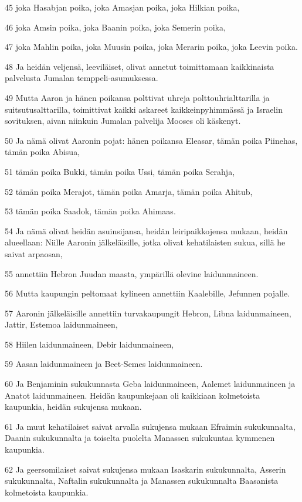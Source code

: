 \par 45 joka Hasabjan poika, joka Amasjan poika, joka Hilkian poika,
\par 46 joka Amsin poika, joka Baanin poika, joka Semerin poika,
\par 47 joka Mahlin poika, joka Muusin poika, joka Merarin poika, joka Leevin poika.
\par 48 Ja heidän veljensä, leeviläiset, olivat annetut toimittamaan kaikkinaista palvelusta Jumalan temppeli-asumuksessa.
\par 49 Mutta Aaron ja hänen poikansa polttivat uhreja polttouhrialttarilla ja suitsutusalttarilla, toimittivat kaikki askareet kaikkeinpyhimmässä ja Israelin sovituksen, aivan niinkuin Jumalan palvelija Mooses oli käskenyt.
\par 50 Ja nämä olivat Aaronin pojat: hänen poikansa Eleasar, tämän poika Piinehas, tämän poika Abisua,
\par 51 tämän poika Bukki, tämän poika Ussi, tämän poika Serahja,
\par 52 tämän poika Merajot, tämän poika Amarja, tämän poika Ahitub,
\par 53 tämän poika Saadok, tämän poika Ahimaas.
\par 54 Ja nämä olivat heidän asuinsijansa, heidän leiripaikkojensa mukaan, heidän alueellaan: Niille Aaronin jälkeläisille, jotka olivat kehatilaisten sukua, sillä he saivat arpaosan,
\par 55 annettiin Hebron Juudan maasta, ympärillä olevine laidunmaineen.
\par 56 Mutta kaupungin peltomaat kylineen annettiin Kaalebille, Jefunnen pojalle.
\par 57 Aaronin jälkeläisille annettiin turvakaupungit Hebron, Libna laidunmaineen, Jattir, Estemoa laidunmaineen,
\par 58 Hiilen laidunmaineen, Debir laidunmaineen,
\par 59 Aasan laidunmaineen ja Beet-Semes laidunmaineen.
\par 60 Ja Benjaminin sukukunnasta Geba laidunmaineen, Aalemet laidunmaineen ja Anatot laidunmaineen. Heidän kaupunkejaan oli kaikkiaan kolmetoista kaupunkia, heidän sukujensa mukaan.
\par 61 Ja muut kehatilaiset saivat arvalla sukujensa mukaan Efraimin sukukunnalta, Daanin sukukunnalta ja toiselta puolelta Manassen sukukuntaa kymmenen kaupunkia.
\par 62 Ja geersomilaiset saivat sukujensa mukaan Isaskarin sukukunnalta, Asserin sukukunnalta, Naftalin sukukunnalta ja Manassen sukukunnalta Baasanista kolmetoista kaupunkia.
